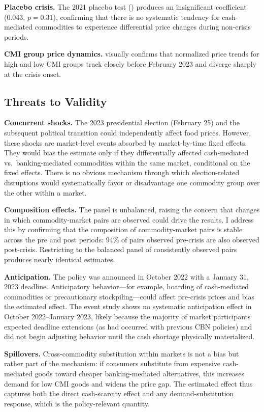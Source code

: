 \documentclass[12pt]{article}
\begin{document}
\textbf{Placebo crisis.} The 2021 placebo test () produces an insignificant coefficient (0.043, $p = 0.31$), confirming that there is no systematic tendency for cash-mediated commodities to experience differential price changes during non-crisis periods.

\textbf{CMI group price dynamics.}  visually confirms that normalized price trends for high and low CMI groups track closely before February 2023 and diverge sharply at the crisis onset.

\subsection{Threats to Validity}

\textbf{Concurrent shocks.} The 2023 presidential election (February 25) and the subsequent political transition could independently affect food prices. However, these shocks are market-level events absorbed by market-by-time fixed effects. They would bias the estimate only if they differentially affected cash-mediated vs.\ banking-mediated commodities within the same market, conditional on the fixed effects. There is no obvious mechanism through which election-related disruptions would systematically favor or disadvantage one commodity group over the other within a market.

\textbf{Composition effects.} The panel is unbalanced, raising the concern that changes in which commodity-market pairs are observed could drive the results. I address this by confirming that the composition of commodity-market pairs is stable across the pre and post periods: 94\% of pairs observed pre-crisis are also observed post-crisis. Restricting to the balanced panel of consistently observed pairs produces nearly identical estimates.

\textbf{Anticipation.} The policy was announced in October 2022 with a January 31, 2023 deadline. Anticipatory behavior---for example, hoarding of cash-mediated commodities or precautionary stockpiling---could affect pre-crisis prices and bias the estimated effect. The event study shows no systematic anticipation effect in October 2022--January 2023, likely because the majority of market participants expected deadline extensions (as had occurred with previous CBN policies) and did not begin adjusting behavior until the cash shortage physically materialized.

\textbf{Spillovers.} Cross-commodity substitution within markets is not a bias but rather part of the mechanism: if consumers substitute from expensive cash-mediated goods toward cheaper banking-mediated alternatives, this increases demand for low CMI goods and widens the price gap. The estimated effect thus captures both the direct cash-scarcity effect and any demand-substitution response, which is the policy-relevant quantity.
\end{document}
